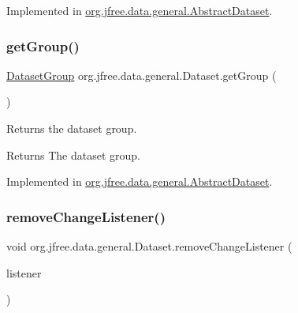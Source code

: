 Implemented in \mbox{\hyperlink{classorg_1_1jfree_1_1data_1_1general_1_1_abstract_dataset_a98ccd0af41c59cd8fe50543376d0faf9}{org.\+jfree.\+data.\+general.\+Abstract\+Dataset}}.

\mbox{\label{interfaceorg_1_1jfree_1_1data_1_1general_1_1_dataset_a48357df0f5aacd555b094627eb02d473}} 
\subsubsection{\texorpdfstring{get\+Group()}{getGroup()}}
{\footnotesize\ttfamily \mbox{\hyperlink{classorg_1_1jfree_1_1data_1_1general_1_1_dataset_group}{Dataset\+Group}} org.\+jfree.\+data.\+general.\+Dataset.\+get\+Group (\begin{DoxyParamCaption}{ }\end{DoxyParamCaption})}

Returns the dataset group.

\begin{DoxyReturn}{Returns}
The dataset group. 
\end{DoxyReturn}


Implemented in \mbox{\hyperlink{classorg_1_1jfree_1_1data_1_1general_1_1_abstract_dataset_a8461feb0ca75008e174e5bf72a56f01d}{org.\+jfree.\+data.\+general.\+Abstract\+Dataset}}.

\mbox{\label{interfaceorg_1_1jfree_1_1data_1_1general_1_1_dataset_a47cc3418a0f49e520f72f8411601afc4}} 
\subsubsection{\texorpdfstring{remove\+Change\+Listener()}{removeChangeListener()}}
{\footnotesize\ttfamily void org.\+jfree.\+data.\+general.\+Dataset.\+remove\+Change\+Listener (\begin{DoxyParamCaption}\item[{\mbox{\hyperlink{interfaceorg_1_1jfree_1_1data_1_1general_1_1_dataset_change_listener}{Dataset\+Change\+Listener}}}]{listener }\end{DoxyParamCaption})}

